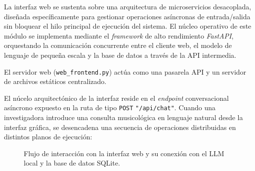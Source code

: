 La interfaz web se sustenta sobre una arquitectura de microservicios desacoplada, diseñada específicamente para gestionar operaciones asíncronas de entrada/salida sin bloquear el hilo principal de ejecución del sistema. El núcleo operativo de este módulo se implementa mediante el \textit{framework} de alto rendimiento \textit{FastAPI}, orquestando la comunicación concurrente entre el cliente web, el modelo de lenguaje de pequeña escala y la base de datos a través de la API intermedia.

El servidor web (\texttt{web\_frontend.py}) actúa como una pasarela API y un servidor de archivos estáticos centralizado. 

El núcelo arquitectónico de la interfaz reside en el \textit{endpoint} conversacional asíncrono expuesto en la ruta de tipo \texttt{POST} \texttt{"/api/chat"}. Cuando una investigadora introduce una consulta musicológica en lenguaje natural desde la interfaz gráfica, se desencadena una secuencia de operaciones distribuidas en distintos planos de ejecución:

\begin{figure}[H]
    \centering
    
    
    \caption{Flujo de interacción con la interfaz web y su conexión con el LLM local y la base de datos SQLite.}
    \label{fig:arquitectura_llm}
\end{figure}

